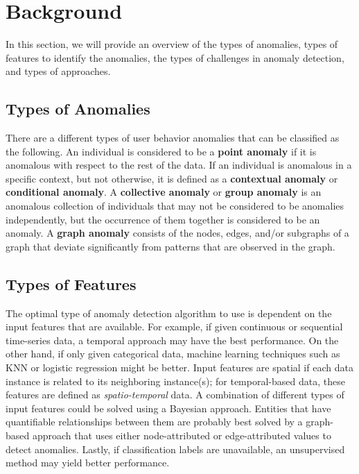 \documentclass[11pt, oneside]{article}   	%
\begin{document}
\section{Background} \label{background}
In this section, we will provide an overview of the types of anomalies, types of features to identify the anomalies, the types of challenges in anomaly detection, and types of approaches. 

\subsection{Types of Anomalies}
\quad There are a different types of user behavior anomalies that can be classified as the following.
An individual is considered to be a \textbf{point anomaly} if it is anomalous with respect to the rest of the data.
If an individual is anomalous in a specific context, but not otherwise, it is defined as a \textbf{contextual anomaly} or \textbf{conditional anomaly}.
A \textbf{collective anomaly} or \textbf{group anomaly} is an anomalous collection of individuals that may not be considered to be anomalies independently, but the occurrence of them together is considered to be an anomaly. \cite{survey1} \cite{survey2}
A \textbf{graph anomaly} consists of the nodes, edges, and/or subgraphs of a graph that deviate significantly from patterns that are observed in the graph. \cite{survey3}

\subsection{Types of Features}
\quad The optimal type of anomaly detection algorithm to use is dependent on the input features that are available.
For example, if given continuous or sequential time-series data, a temporal approach may have the best performance.
On the other hand, if only given categorical data, machine learning techniques such as KNN or logistic regression might be better.
Input features are spatial if each data instance is related to its neighboring instance(s); for temporal-based data, these features are defined as \textit{spatio-temporal} data.
A combination of different types of input features could be solved using a Bayesian approach.
Entities that have quantifiable relationships between them are probably best solved by a graph-based approach that uses either node-attributed or edge-attributed values to detect anomalies.
Lastly, if classification labels are unavailable, an unsupervised method may yield better performance.
\end{document}
